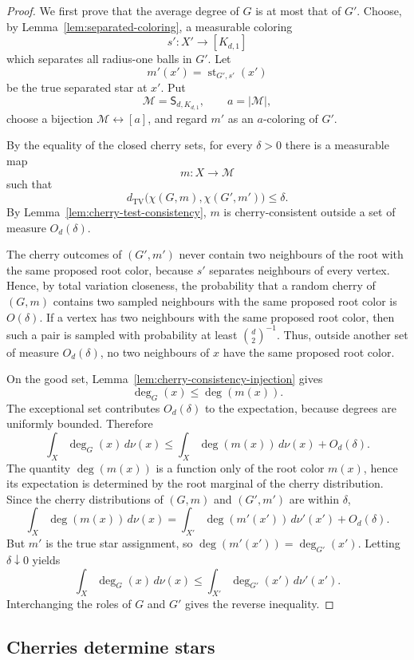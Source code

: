 \documentclass[11pt]{amsart}
\newcommand{\TV}{\operatorname{TV}}
\theoremstyle{remark}
\begin{document}
\begin{proof}
We first prove that the average degree of $G$ is at most that of $G'$. Choose, by Lemma~\ref{lem:separated-coloring}, a measurable coloring
\[
 s'\colon X'\to[K_{d,1}]
\]
which separates all radius-one balls in $G'$. Let
\[
 m'(x')=\operatorname{st}_{G',s'}(x')
\]
be the true separated star at $x'$. Put
\[
 \mathcal M=\mathsf S_{d,K_{d,1}},\qquad a=|\mathcal M|,
\]
choose a bijection $\mathcal M\leftrightarrow[a]$, and regard $m'$ as an $a$-coloring of $G'$.

By the equality of the closed cherry sets, for every $\delta>0$ there is a measurable map
\[
 m\colon X\to\mathcal M
\]
such that
\[
 d_{\TV}\bigl(\chi(G,m),\chi(G',m')\bigr)\leq\delta.
\]
By Lemma~\ref{lem:cherry-test-consistency}, $m$ is cherry-consistent outside a set of measure $O_d(\delta)$.

The cherry outcomes of $(G',m')$ never contain two neighbours of the root with the same proposed root color, because $s'$ separates neighbours of every vertex. Hence, by total variation closeness, the probability that a random cherry of $(G,m)$ contains two sampled neighbours with the same proposed root color is $O(\delta)$. If a vertex has two neighbours with the same proposed root color, then such a pair is sampled with probability at least $\binom d2^{-1}$. Thus, outside another set of measure $O_d(\delta)$, no two neighbours of $x$ have the same proposed root color.

On the good set, Lemma~\ref{lem:cherry-consistency-injection} gives
\[
 \deg_G(x)\leq \deg(m(x)).
\]
The exceptional set contributes $O_d(\delta)$ to the expectation, because degrees are uniformly bounded. Therefore
\[
 \int_X\deg_G(x)\,d\nu(x)\leq \int_X\deg(m(x))\,d\nu(x)+O_d(\delta).
\]
The quantity $\deg(m(x))$ is a function only of the root color $m(x)$, hence its expectation is determined by the root marginal of the cherry distribution. Since the cherry distributions of $(G,m)$ and $(G',m')$ are within $\delta$,
\[
 \int_X\deg(m(x))\,d\nu(x)=\int_{X'}\deg(m'(x'))\,d\nu'(x')+O_d(\delta).
\]
But $m'$ is the true star assignment, so $\deg(m'(x'))=\deg_{G'}(x')$. Letting $\delta\downarrow0$ yields
\[
 \int_X\deg_G(x)\,d\nu(x)\leq \int_{X'}\deg_{G'}(x')\,d\nu'(x').
\]
Interchanging the roles of $G$ and $G'$ gives the reverse inequality.
\end{proof}

\subsection{Cherries determine stars}
\end{document}
